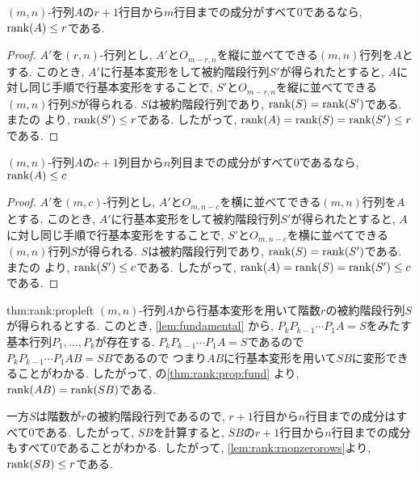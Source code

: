 \begin{lemma}
  \label{lem:rank:rnonzerorows}
  $(m,n)$-行列$A$の$r+1$行目から$m$行目までの成分がすべて$0$であるなら,
  $\operatorname{rank}(A)\leq r$である.
\end{lemma}
\begin{proof}
  $A'$を$(r,n)$-行列とし,
  $A'$と$O_{m-r,n}$を縦に並べてできる$(m,n)$行列を$A$とする.
  このとき, $A'$に行基本変形をして被約階段行列$S'$が得られたとすると,
  $A$に対し同じ手順で行基本変形をすることで,
  $S'$と$O_{m-r,n}$を縦に並べてできる$(m,n)$行列$S$が得られる.
  $S$は被約階段行列であり, $\operatorname{rank}(S)=\operatorname{rank}(S')$である.
  またの
  より, $\operatorname{rank}(S')\leq r$である.
  したがって, $\operatorname{rank}(A)=\operatorname{rank}(S)=\operatorname{rank}(S')\leq r$である.
\end{proof}

\begin{lemma}
  \label{lem:rank:rnonzerocols}
  $(m,n)$-行列$A$の$c+1$列目から$n$列目までの成分がすべて$0$であるなら,
  $\operatorname{rank}(A)\leq c$
\end{lemma}
\begin{proof}
  $A'$を$(m,c)$-行列とし,
  $A'$と$O_{m,n-c}$を横に並べてできる$(m,n)$行列を$A$とする.
  このとき, $A'$に行基本変形をして被約階段行列$S'$が得られたとすると,
  $A$に対し同じ手順で行基本変形をすることで,
  $S'$と$O_{m,n-c}$を横に並べてできる$(m,n)$行列$S$が得られる.
  $S$は被約階段行列であり, $\operatorname{rank}(S)=\operatorname{rank}(S')$である.
  またの
  より, $\operatorname{rank}(S')\leq c$である.
  したがって, $\operatorname{rank}(A)=\operatorname{rank}(S)=\operatorname{rank}(S')\leq c$である.
\end{proof}


\begin{proofof*}{thm:rank:prop}{left}
  $(m,n)$-行列$A$から行基本変形を用いて階数$r$の被約階段行列$S$が得られるとする.
  このとき,
  \cref{lem:fundamental}
  から,
  $P_kP_{k-1}\cdots P_1A=S$をみたす
  基本行列$P_1,\ldots, P_k$が存在する.
  $P_kP_{k-1}\cdots P_1A=S$であるので
  $P_kP_{k-1}\cdots P_1AB=SB$であるので
  つまり$AB$に行基本変形を用いて$SB$に変形できることがわかる.
  したがって,
  の\cref{thm:rank:prop:fund}
  より, $\operatorname{rank}(AB)=\operatorname{rank}(SB)$である.
  
  一方$S$は階数が$r$の被約階段行列であるので,
  $r+1$行目から$n$行目までの成分はすべて$0$である.
  したがって,
  $SB$を計算すると,
  $SB$の$r+1$行目から$n$行目までの成分もすべて$0$であることがわかる.
  したがって, \cref{lem:rank:rnonzerorows}より,
  $\operatorname{rank}(SB)\leq r$である.
\end{proofof*}

